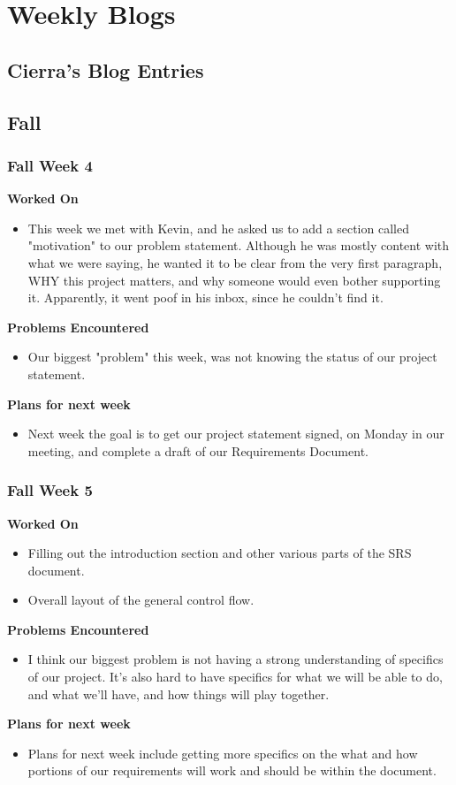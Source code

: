 \documentclass[compsoc,draftclsnofoot,onecolumn,10pt]{IEEEtran}
\begin{document}
\clearpage
\section{Weekly Blogs}

\subsection{Cierra's Blog Entries}
    
\subsection{Fall}
\subsubsection*{Fall Week 4}
\textbf{Worked On}
\begin{itemize}
    \item This week we met with Kevin, and he asked us to add a section called "motivation" to our problem statement. Although he was mostly content with what we were saying, he wanted it to be clear from the very first paragraph, WHY this project matters, and why someone would even bother supporting it. Apparently, it went poof in his inbox, since he couldn't find it.
\end{itemize}
\textbf{Problems Encountered}
\begin{itemize}
    \item Our biggest "problem" this week, was not knowing the status of our project statement.
\end{itemize}
\textbf{Plans for next week}
\begin{itemize}
    \item Next week the goal is to get our project statement signed, on Monday in our meeting, and complete a draft of our Requirements Document.
\end{itemize}


\subsubsection*{Fall Week 5}
\textbf{Worked On}
\begin{itemize}
    \item Filling out the introduction section and other various parts of the SRS document.
    \item Overall layout of the general control flow.
\end{itemize}
\textbf{Problems Encountered}
\begin{itemize}
    \item I think our biggest problem is not having a strong understanding of specifics of our project. It's also hard to have specifics for what we will be able to do, and what we'll have, and how things will play together.
\end{itemize}
\textbf{Plans for next week}
\begin{itemize}
    \item Plans for next week include getting more specifics on the what and how portions of our requirements will work and should be within the document.
\end{itemize}
\end{document}
